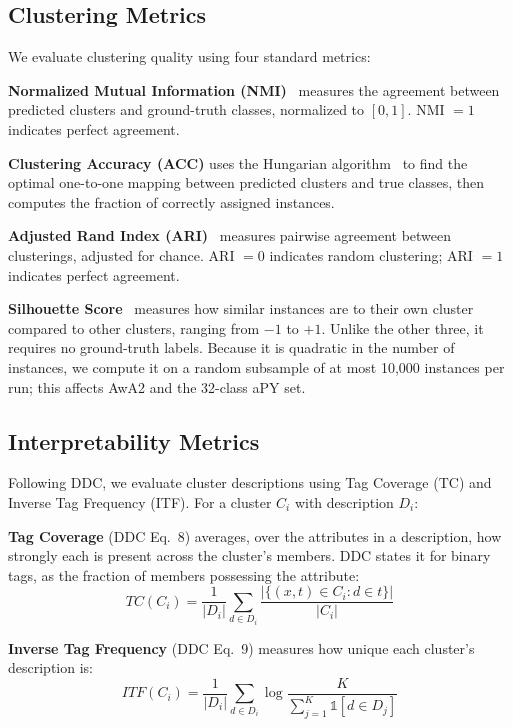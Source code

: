 \subsection{Clustering Metrics}
\label{subsec:clustering_metrics}

We evaluate clustering quality using four standard metrics:

\textbf{Normalized Mutual Information (NMI)}~\citep{Strehl2002} measures the agreement between predicted clusters and ground-truth classes, normalized to $[0,1]$. NMI $= 1$ indicates perfect agreement.

\textbf{Clustering Accuracy (ACC)} uses the Hungarian algorithm~\citep{Kuhn1955} to find the optimal one-to-one mapping between predicted clusters and true classes, then computes the fraction of correctly assigned instances.

\textbf{Adjusted Rand Index (ARI)}~\citep{Hubert1985} measures pairwise agreement between clusterings, adjusted for chance. ARI $= 0$ indicates random clustering; ARI $= 1$ indicates perfect agreement.

\textbf{Silhouette Score}~\citep{Rousseeuw1987} measures how similar instances are to their own cluster compared to other clusters, ranging from $-1$ to $+1$. Unlike the other three, it requires no ground-truth labels. Because it is quadratic in the number of instances, we compute it on a random subsample of at most 10{,}000 instances per run; this affects AwA2 and the 32-class aPY set.

\subsection{Interpretability Metrics}
\label{subsec:interp_metrics}

Following DDC, we evaluate cluster descriptions using Tag Coverage (TC) and Inverse Tag Frequency (ITF). For a cluster $C_i$ with description $D_i$:

\textbf{Tag Coverage} (DDC Eq.\ 8) averages, over the attributes in a description, how strongly each is present across the cluster's members. DDC states it for binary tags, as the fraction of members possessing the attribute:
\begin{equation}
\label{eq:tc}
    TC(C_i) = \frac{1}{|D_i|} \sum_{d \in D_i} \frac{|\{(x,t) \in C_i : d \in t\}|}{|C_i|}
\end{equation}

\textbf{Inverse Tag Frequency} (DDC Eq.\ 9) measures how unique each cluster's description is:
\begin{equation}
\label{eq:itf}
    ITF(C_i) = \frac{1}{|D_i|} \sum_{d \in D_i} \log \frac{K}{\sum_{j=1}^{K} \mathbb{1}[d \in D_j]}
\end{equation}

